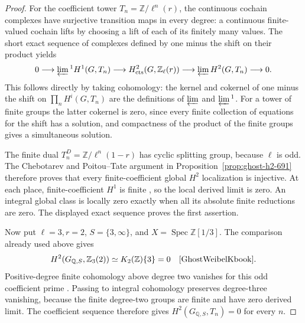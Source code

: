 \begin{proof}
For the coefficient tower \(T_n=\mathbb Z/\ell^n(r)\), the
continuous cochain complexes have surjective transition maps
in every degree: a continuous finite-valued cochain lifts by
choosing a lift of each of its finitely many values. The
short exact sequence of complexes defined by one minus the
shift on their product yields
\[
 0\longrightarrow\varprojlim{}^1 H^1(G,T_n)
 \longrightarrow H^2_{\rm cts}(G,\mathbb Z_\ell(r))
 \longrightarrow\varprojlim H^2(G,T_n)\longrightarrow0.
\]
This follows directly by taking cohomology: the kernel and
cokernel of one minus the shift on \(\prod_n H^i(G,T_n)\)
are the definitions of \(\varprojlim\) and
\(\varprojlim{}^1\). For a tower of finite groups the latter
cokernel is zero, since every finite collection of equations
for the shift has a solution, and compactness of the product
of the finite groups gives a simultaneous solution.

The finite dual \(T_n^D=\mathbb Z/\ell^n(1-r)\) has cyclic
splitting group, because \(\ell\) is odd. The Chebotarev
and Poitou--Tate argument in
Proposition~\ref{prop:ghost-h2-691} therefore proves that
every finite-coefficient global \(H^2\) localization is
injective. At each place, finite-coefficient \(H^1\) is
finite \cite[I.2.1]{GhostMilneADT}, so the local derived
limit is zero. An integral global class is locally zero
exactly when all its absolute finite reductions are zero.
The displayed exact sequence proves the first assertion.

Now put \(\ell=3,r=2\), \(S=\{3,\infty\}\), and
\(X=\operatorname{Spec}\mathbb Z[1/3]\). The comparison
already used above gives
\[
 H^2(G_{\mathbb Q,S},\mathbb Z_3(2))
      \simeq K_2(\mathbb Z)\{3\}=0
 \quad\cite[VI.8.2, VI.10.1.1]{GhostWeibelKbook}.
\]
Positive-degree finite cohomology above degree two vanishes
for this odd coefficient prime
\cite[I.4.10(c)]{GhostMilneADT}. Passing to integral
cohomology preserves degree-three vanishing, because the
finite degree-two groups are finite and have zero derived
limit. The coefficient sequence therefore gives
\(H^2(G_{\mathbb Q,S},T_n)=0\) for every \(n\).


\end{proof}
